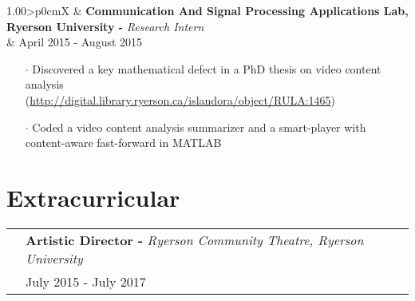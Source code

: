 \documentclass[a4paper, oneside, final]{scrartcl} %
\newcommand{\gray}{\rowcolor[gray]{.90}} %
\begin{document}
\begin{center}
\begin{itemize}
\end{itemize}

\vspace{-0.05cm}

\begin{tabularx}{1.00\linewidth}{>{\raggedleft\scshape}p{0cm}X}
\gray & \textbf{Communication And Signal Processing Applications Lab, Ryerson University -} \textit{Research Intern}\\
\gray & {April 2015 - August 2015}\\
\end{tabularx}
\vspace{-0.2cm}
\begin{itemize}\itemsep-0.2cm
\vspace{-0.1cm}

\item[$\cdot$] Discovered a key mathematical defect in a PhD thesis on video content analysis \\(\url{http://digital.library.ryerson.ca/islandora/object/RULA:1465})\\
\item[$\cdot$] Coded a video content analysis summarizer and a smart-player with content-aware fast-forward in MATLAB\\

\end{itemize}

\section{Extracurricular}

\renewcommand{\arraystretch}{1.3}
\vspace{-0.05cm}

\begin{tabularx}{1.00\linewidth}{>{\raggedleft\scshape}p{0cm}X}
\gray & \textbf{Artistic Director -} \textit{Ryerson Community Theatre, Ryerson University}\\
\gray & {July 2015 - July 2017}\\
\end{tabularx}
\vspace{-0.2cm}
\begin{itemize} \itemsep-0.2cm
\vspace{-0.1cm}


\end{itemize}
\end{center}
\end{document}

